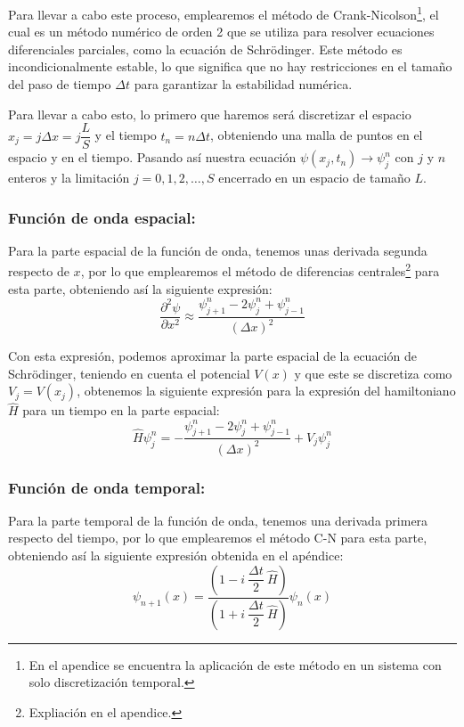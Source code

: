 \documentclass[10pt,onecolumn]{article}
\begin{document}
Para llevar a cabo este proceso, emplearemos el método de Crank-Nicolson\footnote{En el apendice se encuentra la aplicación de este método en un sistema con solo discretización temporal.}, el cual es un método numérico de orden 2 que se utiliza para resolver ecuaciones diferenciales parciales, como la ecuación de Schrödinger. Este método es incondicionalmente estable, lo que significa que no hay restricciones en el tamaño del paso de tiempo $\Delta t$ para garantizar la estabilidad numérica. 


Para llevar a cabo esto, lo primero que haremos será discretizar el espacio $x_j = j\Delta x = j \dfrac{L}{S}$ y el tiempo $t_n = n\Delta t$, obteniendo una malla de puntos en el espacio y en el tiempo. Pasando así nuestra ecuación $\psi(x_j,t_n) \rightarrow \psi_{j}^{n}$ con $j$ y $n$ enteros y la limitación $j = 0, 1, 2, \ldots, S$ encerrado en un espacio de tamaño $L$.

\subsubsection{Función de onda espacial:}

Para la parte espacial de la función de onda, tenemos unas derivada segunda respecto de $x$, por lo que emplearemos el método de diferencias centrales\footnote{Expliación en el apendice.} para esta parte, obteniendo así la siguiente expresión:
\begin{equation}
    \dfrac{\partial^2 \psi}{\partial x^2} \approx \dfrac{\psi_{j+1}^{n} - 2\psi_{j}^{n} + \psi_{j-1}^{n}}{(\Delta x)^2}
\end{equation}

Con esta expresión, podemos aproximar la parte espacial de la ecuación de Schrödinger, teniendo en cuenta el potencial $V(x)$ y que este se discretiza como $V_{j} = V(x_j)$, obtenemos la siguiente expresión para la expresión del hamiltoniano $\hat{H}$ para un tiempo en la parte espacial:
\begin{equation}
    \hat{H} \psi_{j}^{n} = -\dfrac{\psi_{j+1}^{n} - 2\psi_{j}^{n} + \psi_{j-1}^{n}}{(\Delta x)^2} + V_{j} \psi_{j}^{n}
\end{equation}




\subsubsection{Función de onda temporal:}
Para la parte temporal de la función de onda, tenemos una derivada primera respecto del tiempo, por lo que emplearemos el método C-N para esta parte, obteniendo así la siguiente expresión obtenida en el apéndice:
\begin{equation}
    \psi_{n+1}(x) =\dfrac{(1 - i\ \dfrac{\Delta t}{2}\ \hat{H})}{(1 + i\ \dfrac{\Delta t}{2}\ \hat{H})}\psi_n(x)
\end{equation}
\end{document}
